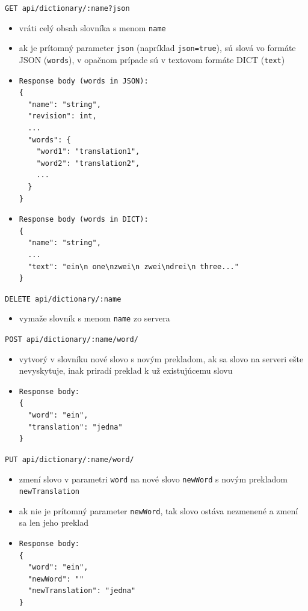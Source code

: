 \documentclass[
  digital, %
  table,   %
  lof,     %
  lot,     %
]{fithesis3}
\begin{document}
\noindent
\texttt{GET api/dictionary/:name?json}
\begin{itemize}
\item vráti celý obsah slovníka s menom \texttt{name}
\item ak je prítomný parameter \texttt{json} (napríklad \texttt{json=true}), sú slová vo formáte JSON (\texttt{words}), v opačnom prípade sú v textovom formáte DICT (\texttt{text})
\item \begin{lstlisting}[basicstyle=\small]
Response body (words in JSON):
{
  "name": "string",
  "revision": int,
  ...
  "words": {
  	"word1": "translation1",
    "word2": "translation2",
    ...
  }
}
\end{lstlisting}
\item \begin{lstlisting}[basicstyle=\small]
Response body (words in DICT):
{
  "name": "string",
  ...
  "text": "ein\n one\nzwei\n zwei\ndrei\n three..."
}
\end{lstlisting}
\end{itemize}

\noindent
\texttt{DELETE api/dictionary/:name}
\begin{itemize}
\item vymaže slovník s menom \texttt{name} zo servera
\end{itemize}

\noindent
\texttt{POST api/dictionary/:name/word/}
\begin{itemize}
\item vytvorý v slovníku nové slovo s novým prekladom, ak sa slovo na serveri ešte nevyskytuje, inak priradí preklad k už existujúcemu slovu 
\item \begin{lstlisting}[basicstyle=\small]
Response body:
{
  "word": "ein",
  "translation": "jedna"
}
\end{lstlisting}
\end{itemize}

\noindent
\texttt{PUT api/dictionary/:name/word/}
\begin{itemize}
\item zmení slovo v parametri \texttt{word} na nové slovo \texttt{newWord} s novým prekladom \texttt{newTranslation}
\item ak nie je prítomný parameter \texttt{newWord}, tak slovo ostáva nezmenené a zmení sa len jeho preklad
\item \begin{lstlisting}[basicstyle=\small]
Response body:
{
  "word": "ein",
  "newWord": ""
  "newTranslation": "jedna"
}
\end{lstlisting}
\end{itemize}
\end{document}
